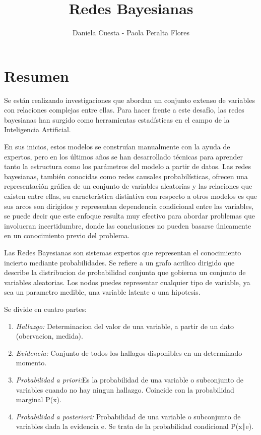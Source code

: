 \documentclass[
  letterpaper,
  DIV=11,
  numbers=noendperiod]{scrartcl}
\title{Redes Bayesianas}
\author{Daniela Cuesta - Paola Peralta Flores}
\date{}
\providecommand{\tightlist}{%
  \setlength{\itemsep}{0pt}\setlength{\parskip}{0pt}}\usepackage{longtable,booktabs,array}
\begin{document}
\maketitle
\ifdefined\Shaded\renewenvironment{Shaded}{\begin{tcolorbox}[borderline west={3pt}{0pt}{shadecolor}, frame hidden, boxrule=0pt, interior hidden, enhanced, sharp corners, breakable]}{\end{tcolorbox}}\fi

\hypertarget{resumen}{%
\section{Resumen}\label{resumen}}

Se están realizando investigaciones que abordan un conjunto extenso de
variables con relaciones complejas entre ellas. Para hacer frente a este
desafío, las redes bayesianas han surgido como herramientas estadísticas
en el campo de la Inteligencia Artificial.

En sus inicios, estos modelos se construían manualmente con la ayuda de
expertos, pero en los últimos años se han desarrollado técnicas para
aprender tanto la estructura como los parámetros del modelo a partir de
datos. Las redes bayesianas, también conocidas como redes causales
probabilísticas, ofrecen una representación gráfica de un conjunto de
variables aleatorias y las relaciones que existen entre ellas, su
característica distintiva con respecto a otros modelos es que sus arcos
son dirigidos y representan dependencia condicional entre las variables,
se puede decir que este enfoque resulta muy efectivo para abordar
problemas que involucran incertidumbre, donde las conclusiones no pueden
basarse únicamente en un conocimiento previo del problema.

Las Redes Bayesianas son sistemas expertos que representan el
conocimiento incierto mediante probabilidades. Se refiere a un grafo
acrilico dirigido que describe la distribucion de probabilidad conjunta
que gobierna un conjunto de variables aleatorias. Los nodos puedes
representar cualquier tipo de variable, ya sea un parametro medible, una
variable latente o una hipotesis.

Se divide en cuatro partes:

\begin{enumerate}
\def\labelenumi{\arabic{enumi}.}
\tightlist
\item
  \emph{Hallazgo:} Determinacion del valor de una variable, a partir de
  un dato (obervacion, medida).
\item
  \emph{Evidencia:} Conjunto de todos los hallagos disponibles en un
  determinado momento.
\item
  \emph{Probabilidad a priori:}Es la probabilidad de una variable o
  subconjunto de variables cuando no hay ningun hallazgo. Coincide con
  la probabilidad marginal P(x).
\item
  \emph{Probabilidad a posteriori:} Probabilidad de una variable o
  subconjunto de variables dada la evidencia e. Se trata de la
  probabilidad condicional P(x∣e).
\end{enumerate}
\end{document}
